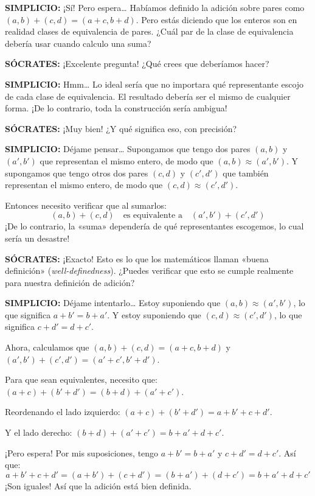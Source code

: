 \medskip
\noindent\textbf{SIMPLICIO:} ¡Sí! Pero espera\ldots{} Habíamos definido la adición sobre pares como $(a, b) + (c, d) = (a+c, b+d)$. Pero estás diciendo que los enteros son en realidad clases de equivalencia de pares. ¿Cuál par de la clase de equivalencia debería usar cuando calculo una suma?

\medskip
\noindent\textbf{SÓCRATES:} ¡Excelente pregunta! ¿Qué crees que deberíamos hacer?

\medskip
\noindent\textbf{SIMPLICIO:} Hmm\ldots{} Lo ideal sería que no importara qué representante escojo de cada clase de equivalencia. El resultado debería ser el mismo de cualquier forma. ¡De lo contrario, toda la construcción sería ambigua!

\medskip
\noindent\textbf{SÓCRATES:} ¡Muy bien! ¿Y qué significa eso, con precisión?

\medskip
\noindent\textbf{SIMPLICIO:} Déjame pensar\ldots{} Supongamos que tengo dos pares $(a, b)$ y $(a', b')$ que representan el mismo entero, de modo que $(a, b) \approx (a', b')$. Y supongamos que tengo otros dos pares $(c, d)$ y $(c', d')$ que también representan el mismo entero, de modo que $(c, d) \approx (c', d')$.

Entonces necesito verificar que al sumarlos:
\[
  (a, b) + (c, d) \quad\text{es equivalente a}\quad (a', b') + (c', d')
\]
¡De lo contrario, la «suma» dependería de qué representantes escogemos, lo cual sería un desastre!

\medskip
\noindent\textbf{SÓCRATES:} ¡Exacto! Esto es lo que los matemáticos llaman «buena definición» (\textit{well-definedness}). ¿Puedes verificar que esto se cumple realmente para nuestra definición de adición?

\medskip
\noindent\textbf{SIMPLICIO:} Déjame intentarlo\ldots{} Estoy suponiendo que $(a, b) \approx (a', b')$, lo que significa $a + b' = b + a'$. Y estoy suponiendo que $(c, d) \approx (c', d')$, lo que significa $c + d' = d + c'$.

Ahora, calculamos que $(a, b) + (c, d) = (a+c, b+d)$ y $(a', b') + (c', d') = (a'+c', b'+d')$.

Para que sean equivalentes, necesito que: $(a+c) + (b'+d') = (b+d) + (a'+c')$.

Reordenando el lado izquierdo: $(a+c) + (b'+d') = a + b' + c + d'$.

Y el lado derecho: $(b+d) + (a'+c') = b + a' + d + c'$.

¡Pero espera! Por mis suposiciones, tengo $a + b' = b + a'$ y $c + d' = d + c'$. Así que:
\[
  a + b' + c + d' = (a + b') + (c + d') = (b + a') + (d + c') = b + a' + d + c'
\]
¡Son iguales! Así que la adición está bien definida.

